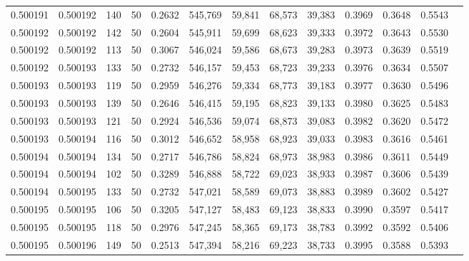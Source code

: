 \begin{tabular}{rrrrrrrrrrrrr}
0.500191 & 0.500192 &   140 &  50 &                                     0.2632 & 545,769 &  59,841 &  68,573 &  39,383 & 0.3969 & 0.3648 & 0.5543 \\
0.500192 & 0.500192 &   142 &  50 &                                     0.2604 & 545,911 &  59,699 &  68,623 &  39,333 & 0.3972 & 0.3643 & 0.5530 \\
0.500192 & 0.500192 &   113 &  50 &                                     0.3067 & 546,024 &  59,586 &  68,673 &  39,283 & 0.3973 & 0.3639 & 0.5519 \\
0.500192 & 0.500193 &   133 &  50 &                                     0.2732 & 546,157 &  59,453 &  68,723 &  39,233 & 0.3976 & 0.3634 & 0.5507 \\
0.500193 & 0.500193 &   119 &  50 &                                     0.2959 & 546,276 &  59,334 &  68,773 &  39,183 & 0.3977 & 0.3630 & 0.5496 \\
0.500193 & 0.500193 &   139 &  50 &                                     0.2646 & 546,415 &  59,195 &  68,823 &  39,133 & 0.3980 & 0.3625 & 0.5483 \\
0.500193 & 0.500193 &   121 &  50 &                                     0.2924 & 546,536 &  59,074 &  68,873 &  39,083 & 0.3982 & 0.3620 & 0.5472 \\
0.500193 & 0.500194 &   116 &  50 &                                     0.3012 & 546,652 &  58,958 &  68,923 &  39,033 & 0.3983 & 0.3616 & 0.5461 \\
0.500194 & 0.500194 &   134 &  50 &                                     0.2717 & 546,786 &  58,824 &  68,973 &  38,983 & 0.3986 & 0.3611 & 0.5449 \\
0.500194 & 0.500194 &   102 &  50 &                                     0.3289 & 546,888 &  58,722 &  69,023 &  38,933 & 0.3987 & 0.3606 & 0.5439 \\
0.500194 & 0.500195 &   133 &  50 &                                     0.2732 & 547,021 &  58,589 &  69,073 &  38,883 & 0.3989 & 0.3602 & 0.5427 \\
0.500195 & 0.500195 &   106 &  50 &                                     0.3205 & 547,127 &  58,483 &  69,123 &  38,833 & 0.3990 & 0.3597 & 0.5417 \\
0.500195 & 0.500195 &   118 &  50 &                                     0.2976 & 547,245 &  58,365 &  69,173 &  38,783 & 0.3992 & 0.3592 & 0.5406 \\
0.500195 & 0.500196 &   149 &  50 &                                     0.2513 & 547,394 &  58,216 &  69,223 &  38,733 & 0.3995 & 0.3588 & 0.5393 \\

\end{tabular}
